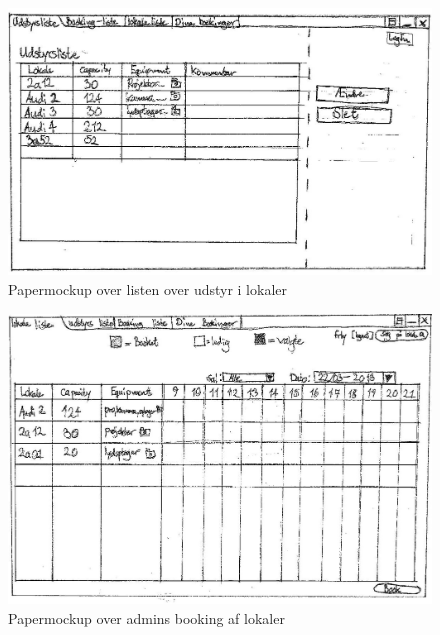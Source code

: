 \begin{figure}[h!]
  \centering
    \includegraphics[angle=90, height=0.9\textheight]{Appendix/GUI-Prototype/PaperMockup/LokaleUdstyrListe_001}
  \caption{Papermockup over listen over udstyr i lokaler}
\label{App_GUI_paper_LokaleUdstyrListe}
\end{figure}

\begin{figure}[h!]
  \centering
    \includegraphics[angle=90, height=0.9\textheight]{Appendix/GUI-Prototype/PaperMockup/LokaleListeSuper_001}
  \caption{Papermockup over admins booking af lokaler}
\label{App_GUI_paper_LokaleListeSuper}
\end{figure}

